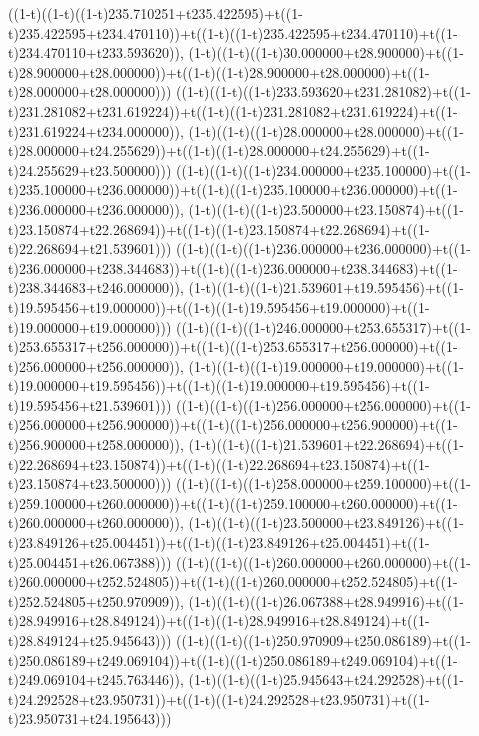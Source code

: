 ((1-t)((1-t)((1-t)235.710251+t235.422595)+t((1-t)235.422595+t234.470110))+t((1-t)((1-t)235.422595+t234.470110)+t((1-t)234.470110+t233.593620)),                                     (1-t)((1-t)((1-t)30.000000+t28.900000)+t((1-t)28.900000+t28.000000))+t((1-t)((1-t)28.900000+t28.000000)+t((1-t)28.000000+t28.000000)))
((1-t)((1-t)((1-t)233.593620+t231.281082)+t((1-t)231.281082+t231.619224))+t((1-t)((1-t)231.281082+t231.619224)+t((1-t)231.619224+t234.000000)),                                     (1-t)((1-t)((1-t)28.000000+t28.000000)+t((1-t)28.000000+t24.255629))+t((1-t)((1-t)28.000000+t24.255629)+t((1-t)24.255629+t23.500000)))
((1-t)((1-t)((1-t)234.000000+t235.100000)+t((1-t)235.100000+t236.000000))+t((1-t)((1-t)235.100000+t236.000000)+t((1-t)236.000000+t236.000000)),                                     (1-t)((1-t)((1-t)23.500000+t23.150874)+t((1-t)23.150874+t22.268694))+t((1-t)((1-t)23.150874+t22.268694)+t((1-t)22.268694+t21.539601)))
((1-t)((1-t)((1-t)236.000000+t236.000000)+t((1-t)236.000000+t238.344683))+t((1-t)((1-t)236.000000+t238.344683)+t((1-t)238.344683+t246.000000)),                                     (1-t)((1-t)((1-t)21.539601+t19.595456)+t((1-t)19.595456+t19.000000))+t((1-t)((1-t)19.595456+t19.000000)+t((1-t)19.000000+t19.000000)))
((1-t)((1-t)((1-t)246.000000+t253.655317)+t((1-t)253.655317+t256.000000))+t((1-t)((1-t)253.655317+t256.000000)+t((1-t)256.000000+t256.000000)),                                     (1-t)((1-t)((1-t)19.000000+t19.000000)+t((1-t)19.000000+t19.595456))+t((1-t)((1-t)19.000000+t19.595456)+t((1-t)19.595456+t21.539601)))
((1-t)((1-t)((1-t)256.000000+t256.000000)+t((1-t)256.000000+t256.900000))+t((1-t)((1-t)256.000000+t256.900000)+t((1-t)256.900000+t258.000000)),                                     (1-t)((1-t)((1-t)21.539601+t22.268694)+t((1-t)22.268694+t23.150874))+t((1-t)((1-t)22.268694+t23.150874)+t((1-t)23.150874+t23.500000)))
((1-t)((1-t)((1-t)258.000000+t259.100000)+t((1-t)259.100000+t260.000000))+t((1-t)((1-t)259.100000+t260.000000)+t((1-t)260.000000+t260.000000)),                                     (1-t)((1-t)((1-t)23.500000+t23.849126)+t((1-t)23.849126+t25.004451))+t((1-t)((1-t)23.849126+t25.004451)+t((1-t)25.004451+t26.067388)))
((1-t)((1-t)((1-t)260.000000+t260.000000)+t((1-t)260.000000+t252.524805))+t((1-t)((1-t)260.000000+t252.524805)+t((1-t)252.524805+t250.970909)),                                     (1-t)((1-t)((1-t)26.067388+t28.949916)+t((1-t)28.949916+t28.849124))+t((1-t)((1-t)28.949916+t28.849124)+t((1-t)28.849124+t25.945643)))
((1-t)((1-t)((1-t)250.970909+t250.086189)+t((1-t)250.086189+t249.069104))+t((1-t)((1-t)250.086189+t249.069104)+t((1-t)249.069104+t245.763446)),                                     (1-t)((1-t)((1-t)25.945643+t24.292528)+t((1-t)24.292528+t23.950731))+t((1-t)((1-t)24.292528+t23.950731)+t((1-t)23.950731+t24.195643)))

